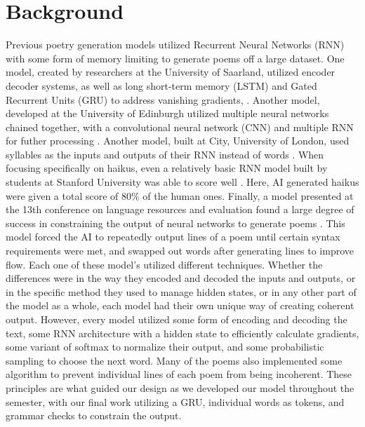 \documentclass{article} %
\begin{document}
\section{Background}
Previous poetry generation models utilized Recurrent Neural Networks (RNN) with some form of memory limiting to generate poems off a large dataset.
One model, created by researchers at the University of Saarland, utilized encoder decoder systems, as well as long short-term memory (LSTM) and Gated Recurrent Units (GRU) to address vanishing gradients, \citep{novikovaenglish}. 
Another model, developed at the University of Edinburgh utilized multiple neural networks chained together, with a convolutional neural network (CNN) and multiple RNN for futher processing \citep{zhang2014chinese}. 
Another model, built at City, University of London, used syllables as the inputs and outputs of their RNN instead of words \citep{lewis2021syllable}. 
When focusing specifically on haikus, even a relatively basic RNN model built by students at Stanford University was able to score well \citep{haikugeneration}. Here, AI generated haikus were given a total score of 80\% of the human ones. 
Finally, a model presented at the 13th conference on language resources and evaluation found a large degree of success in constraining the output of neural networks to generate poems \citep{popescu2022constrained}. 
This model forced the AI to repeatedly output lines of a poem until certain syntax requirements were met, and swapped out words after generating lines to improve flow. 
Each one of these model's utilized different techniques. Whether the differences were in the way they encoded and decoded the inputs and outputs, or in the specific method they used to manage hidden states, or in any other part of the model as a whole, each model had their own unique way of creating coherent output. 
However, every model utilized some form of encoding and decoding the text, some RNN architecture with a hidden state to efficiently calculate gradients, some variant of softmax to normalize their output, and some probabilistic sampling to choose the next word. Many of the poems also implemented some algorithm to prevent individual lines of each poem from being incoherent. These principles are what guided our design as we developed our model throughout the semester, with our final work utilizing a GRU, individual words as tokens, and grammar checks to constrain the output.
\end{document}
